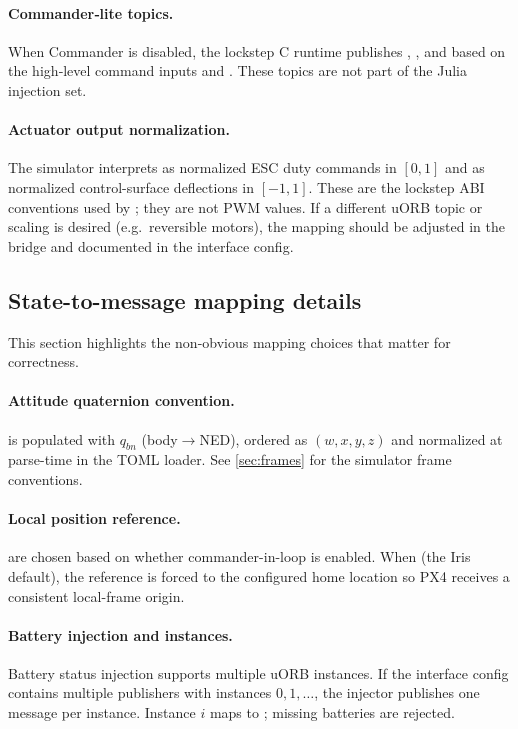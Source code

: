 \paragraph{Commander‑lite topics.}
When Commander is disabled, the lockstep C runtime publishes ,
, and  based on the high‑level command
inputs and . These topics are not part of the Julia injection set.

\paragraph{Actuator output normalization.}
The simulator interprets  as normalized ESC duty commands in \([0,1]\) and  as normalized control-surface deflections in \([-1,1]\). These are the lockstep ABI conventions used by ; they are not PWM values. If a different uORB topic or scaling is desired (e.g.\ reversible motors), the mapping should be adjusted in the bridge and documented in the interface config.

\subsection{State-to-message mapping details}

This section highlights the non-obvious mapping choices that matter for correctness.

\paragraph{Attitude quaternion convention.}
 is populated with \(q_{bn}\) (body$\to$NED), ordered as \((w,x,y,z)\) and normalized at parse-time in the TOML loader. See \cref{sec:frames} for the simulator frame conventions.

\paragraph{Local position reference.}
 are chosen based on whether commander-in-loop is enabled. When  (the Iris default), the reference is forced to the configured home location so PX4 receives a consistent local-frame origin.

\paragraph{Battery injection and instances.}
Battery status injection supports multiple uORB instances. If the interface config contains multiple  publishers with instances \(0,1,\dots\), the injector publishes one message per instance. Instance \(i\) maps to ; missing batteries are rejected.

